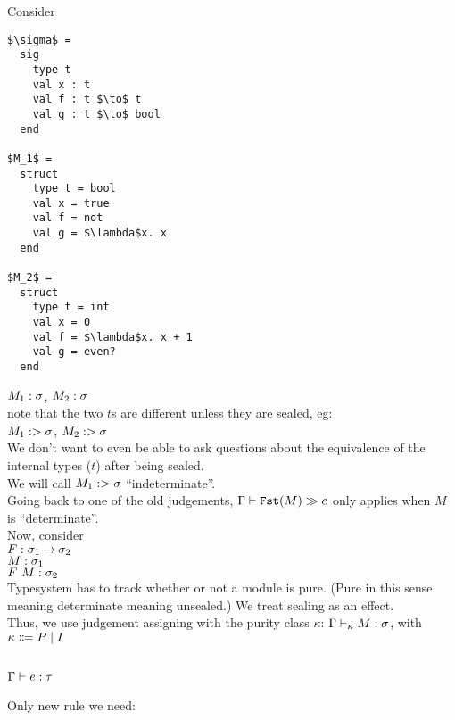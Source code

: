 Consider
\begin{lstlisting}
$\sigma$ =
  sig
    type t
    val x : t
    val f : t $\to$ t
    val g : t $\to$ bool
  end

$M_1$ =
  struct
    type t = bool
    val x = true
    val f = not
    val g = $\lambda$x. x
  end

$M_2$ =
  struct
    type t = int
    val x = 0
    val f = $\lambda$x. x + 1
    val g = even?
  end
\end{lstlisting}

$M_1 \of \sigma$, $M_2 \of \sigma$ \\
note that the two $t$s are different unless they are sealed, eg: \\
$\seal{M_1}{\sigma}$, $\seal{M_2}{\sigma}$ \\

We don't want to even be able to ask questions about the equivalence of
the internal types ($t$) after being sealed. \\
We will call $\seal{M_1}{\sigma}$ ``indeterminate''. \\

Going back to one of the old judgements,
$\Gamma \vd \Fst{M} \gg c$ only applies when $M$ is ``determinate''. \\


Now, consider \\
$F \of \sigma_1 \arrow \sigma_2$ \\ %
$M \of \sigma_1$ \\
$\ap{F}{M} \of \sigma_2$ \\

Typesystem has to track whether or not a module is pure. (Pure in this sense
meaning determinate meaning unsealed.) We treat sealing as an effect. \\ %

Thus, we use judgement assigning with the purity class $\kappa$: 
$\Gamma \vd_\kappa M \of \sigma$, with $\kappa \bnfdef P \bnfalt I$ \\

\subsection{$\Gamma \vd e \of \tau$}
Only new rule we need:
\begin{mathpar}
\end{mathpar}

